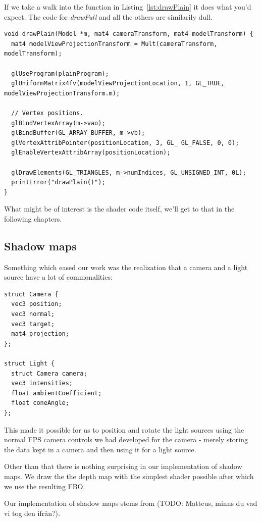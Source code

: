 \documentclass[a4paper,12pt]{article}
\begin{document}
If we take a walk into the function in Listing~\ref{lst:drawPlain} it does what you'd expect. The code for \emph{drawFull} and all the others are similarily dull.

\begin{lstlisting}[label=lst:drawPlain,caption= The contents of the drawPlain function.]
void drawPlain(Model *m, mat4 cameraTransform, mat4 modelTransform) {
  mat4 modelViewProjectionTransform = Mult(cameraTransform, modelTransform);

  glUseProgram(plainProgram);
  glUniformMatrix4fv(modelViewProjectionLocation, 1, GL_TRUE, modelViewProjectionTransform.m);

  // Vertex positions.
  glBindVertexArray(m->vao);
  glBindBuffer(GL_ARRAY_BUFFER, m->vb);
  glVertexAttribPointer(positionLocation, 3, GL_ GL_FALSE, 0, 0);
  glEnableVertexAttribArray(positionLocation);

  glDrawElements(GL_TRIANGLES, m->numIndices, GL_UNSIGNED_INT, 0L);
  printError("drawPlain()");
}
\end{lstlisting}

What might be of interest is the shader code itself, we'll get to that in the following chapters.


\subsection{Shadow maps}

Something which eased our work was the realization that a camera and a light source have a lot of commonalities:

\begin{lstlisting}[label=lst:lamp-struct,caption=Light source struct]
struct Camera {
  vec3 position;
  vec3 normal;
  vec3 target;
  mat4 projection;
};

struct Light {
  struct Camera camera;
  vec3 intensities;
  float ambientCoefficient;
  float coneAngle;
};
\end{lstlisting}

This made it possible for us to position and rotate the light sources using the normal FPS camera controls we had developed for the camera - merely storing the data kept in a camera and then using it for a light source.

Other than that there is nothing surprising in our implementation of shadow maps. We draw the the depth map with the simplest shader possible after which we use the resulting FBO.

Our implementation of shadow maps stems from (TODO: Matteus, minns du vad vi tog den ifrån?).
\end{document}
